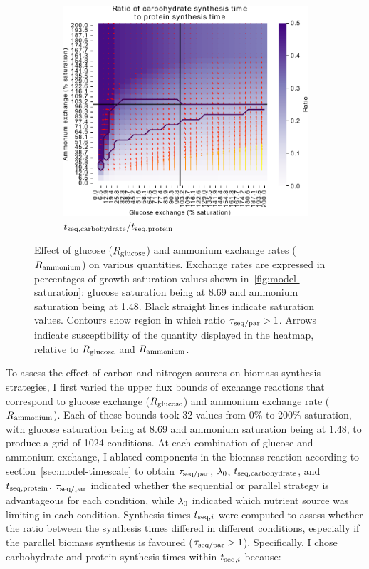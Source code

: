 \begin{figure}
  \begin{subfigure}[t]{0.45\textwidth}
  \centering
    \includegraphics[width=\linewidth]{ec_grid_glc_amm_carb_to_prot}
    \caption{
      $t_{\mathrm{seq},\mathrm{carbohydrate}}/t_{\mathrm{seq},\mathrm{protein}}$
    }
    \label{fig:model-grid-glc-carb-to-prot}
  \end{subfigure}
  \caption{
    Effect of glucose ($R_{\mathrm{glucose}}$) and ammonium exchange rates ($R_{\mathrm{ammonium}}$) on various quantities.
    Exchange rates are expressed in percentages of growth saturation values shown in~\ref{fig:model-saturation}: glucose saturation being at \SI{8.69}{\mmolgdwh} and ammonium saturation being at \SI{1.48}{\mmolgdwh}.
    Black straight lines indicate saturation values.
    Contours show region in which ratio $\tau_{\mathrm{seq}/\mathrm{par}} > 1$.
    Arrows indicate susceptibility of the quantity displayed in the heatmap, relative to $R_{\mathrm{glucose}}$ and $R_{\mathrm{ammonium}}$.
  }
  \label{fig:model-grid-glc}
\end{figure}

To assess the effect of carbon and nitrogen sources on biomass synthesis strategies, I first varied the upper flux bounds of exchange reactions that correspond to glucose exchange ($R_{\mathrm{glucose}}$) and ammonium exchange rate ($R_{\mathrm{ammonium}}$).
Each of these bounds took 32 values from 0\% to 200\% saturation, with glucose saturation being at \SI{8.69}{\mmolgdwh} and ammonium saturation being at \SI{1.48}{\mmolgdwh}, to produce a grid of \num{1024} conditions.
At each combination of glucose and ammonium exchange, I ablated components in the biomass reaction according to section~\ref{sec:model-timescale} to obtain $\tau_{\mathrm{seq}/\mathrm{par}}$, $\lambda_{0}$, $t_{\mathrm{seq},\mathrm{carbohydrate}}$, and $t_{\mathrm{seq},\mathrm{protein}}$.
$\tau_{\mathrm{seq}/\mathrm{par}}$ indicated whether the sequential or parallel strategy is advantageous for each condition, while $\lambda_{0}$ indicated which nutrient source was limiting in each condition.
Synthesis times $t_{\mathrm{seq},i}$ were computed to assess whether the ratio between the synthesis times differed in different conditions, especially if the parallel biomass synthesis is favoured ($\tau_{\mathrm{seq}/\mathrm{par}} > 1$).
Specifically, I chose carbohydrate and protein synthesis times within $t_{\mathrm{seq},i}$ because:

